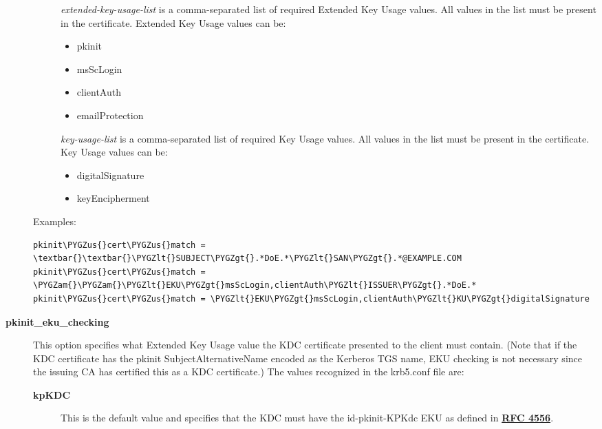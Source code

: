\documentclass[letterpaper,10pt,english]{sphinxmanual}
\def\PYGZus{\char`\_}
\def\PYGZam{\char`\&}
\def\PYGZlt{\char`\<}
\def\PYGZgt{\char`\>}
\begin{document}
\begin{description}
\begin{description}
\emph{extended-key-usage-list} is a comma-separated list of
required Extended Key Usage values.  All values in the list
must be present in the certificate.  Extended Key Usage values
can be:
\begin{itemize}
\item {} 
pkinit

\item {} 
msScLogin

\item {} 
clientAuth

\item {} 
emailProtection

\end{itemize}

\emph{key-usage-list} is a comma-separated list of required Key
Usage values.  All values in the list must be present in the
certificate.  Key Usage values can be:
\begin{itemize}
\item {} 
digitalSignature

\item {} 
keyEncipherment

\end{itemize}

\end{description}

Examples:

\begin{Verbatim}[commandchars=\\\{\}]
pkinit\PYGZus{}cert\PYGZus{}match = \textbar{}\textbar{}\PYGZlt{}SUBJECT\PYGZgt{}.*DoE.*\PYGZlt{}SAN\PYGZgt{}.*@EXAMPLE.COM
pkinit\PYGZus{}cert\PYGZus{}match = \PYGZam{}\PYGZam{}\PYGZlt{}EKU\PYGZgt{}msScLogin,clientAuth\PYGZlt{}ISSUER\PYGZgt{}.*DoE.*
pkinit\PYGZus{}cert\PYGZus{}match = \PYGZlt{}EKU\PYGZgt{}msScLogin,clientAuth\PYGZlt{}KU\PYGZgt{}digitalSignature
\end{Verbatim}

\item[{\textbf{pkinit\_eku\_checking}}] \leavevmode
This option specifies what Extended Key Usage value the KDC
certificate presented to the client must contain.  (Note that if
the KDC certificate has the pkinit SubjectAlternativeName encoded
as the Kerberos TGS name, EKU checking is not necessary since the
issuing CA has certified this as a KDC certificate.)  The values
recognized in the krb5.conf file are:
\begin{description}
\item[{\textbf{kpKDC}}] \leavevmode
This is the default value and specifies that the KDC must have
the id-pkinit-KPKdc EKU as defined in \href{http://tools.ietf.org/html/rfc4556.html}{\textbf{RFC 4556}}.


\end{description}
\end{description}
\end{document}
